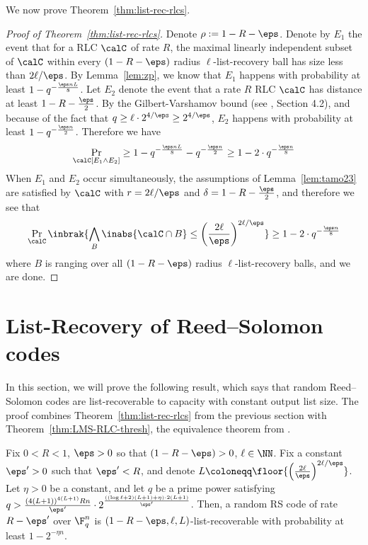 \documentclass{article}
\begin{document}
We now prove Theorem~\ref{thm:list-rec-rlcs}.
\begin{proof}[Proof of Theorem~\ref{thm:list-rec-rlcs}]
    Denote $\rho := 1-R-\eps$.
    Denote by $E_1$ the event that for a RLC $\calC$ of rate $R$, the maximal linearly independent subset of $\calC$ within every $(1-R-\eps)$ radius $\ell$-list-recovery ball has size less than $2\ell/\eps$. 
    By Lemma~\ref{lem:zp}, we know that $E_1$ happens with probability at least $1-q^{-\frac{\eps nL}{8}}$.
    Let $E_2$ denote the event that a rate $R$ RLC $\calC$ has distance at least $1-R-\frac{\eps}{2}$.
    By the Gilbert-Varshamov bound (see \cite{guruswami2022essential}, Section 4.2), and because of the fact that $q\ge \ell \cdot 2^{4/\eps} \ge 2^{4/\eps}$, $E_2$ happens with probability at least $1-q^{-\frac{\eps n}{2}}$.
    Therefore we have
    \[
        \Pr_\calC[E_1 \land E_2] \ge 1-q^{-\frac{\eps nL}{8}}-q^{-\frac{\eps n}{2}} \ge 1-2\cdot q^{-\frac{\eps n}{8}}
    \]
    When $E_1$ and $E_2$ occur simultaneously, the assumptions of Lemma~\ref{lem:tamo23} are satisfied by $\calC$ with $r=2\ell / \eps$ and $\delta=1-R-\frac{\eps}{2}$, and therefore we see that
    \[
        \Pr_\calC\inbrak{\bigwedge_B \inabs{ \calC \cap B} \le \left(\frac{2\ell}{\eps}\right)^{2\ell / \eps}} \ge 1-2\cdot q^{-\frac{\eps n}{8}}
    \]
    where $B$ is ranging over all $(1-R-\eps)$ radius $\ell$-list-recovery balls, and we are done.
\end{proof}

\section{List-Recovery of Reed--Solomon codes}\label{sec:list-rec-rs}
In this section, we will prove the following result, which says that random Reed--Solomon codes are list-recoverable to capacity with constant output list size. The proof combines Theorem~\ref{thm:list-rec-rlcs} from the previous section with Theorem~\ref{thm:LMS-RLC-thresh}, the equivalence theorem from \cite{levi2024random}.
\begin{corollary}\label{cor:list-rec-rs}
    Fix $0 < R < 1$, $\eps>0$ so that $(1-R-\eps)>0$, $\ell \in \NN$.
    Fix a constant $\eps'>0$ such that $\eps' < R$, and denote $L \coloneqq \floor{\left(\frac{2\ell}{\eps}\right)^{2\ell/\eps}}$.
    Let $\eta>0$ be a constant, and let $q$ be a prime power satisfying $q > \frac{(4(L+1))^{4(L+1)}Rn}{\eps'}\cdot 2^{\frac{((\log \ell + 2)(L+1)+ \eta)\cdot 2(L+1)}{\eps'}}$.
    Then, a random RS code of rate $R-\eps'$ over $\F_q^n$ is $(1-R-\eps, \ell, L)$-list-recoverable with probability at least $1-2^{-\eta n}$.
\end{corollary}
\end{document}

